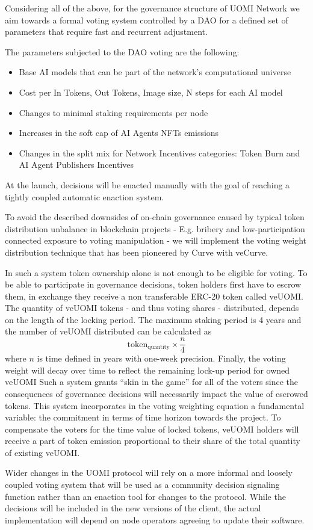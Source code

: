 \documentclass{article}
\begin{document}
Considering all of the above, for the governance structure of UOMI Network we aim towards a formal voting system controlled by a DAO for a defined set of parameters that require fast and recurrent adjustment.

The parameters subjected to the DAO voting are the following:

\begin{itemize}

\item Base AI models that can be part of the network's computational universe
\item Cost per In Tokens, Out Tokens,  Image size, N steps for each AI model
\item Changes to minimal staking requirements per node
\item Increases in the soft cap of AI Agents NFTs emissions
\item Changes in the split mix for Network Incentives categories: Token Burn and AI Agent Publishers Incentives

\end{itemize}

At the launch, decisions will be enacted manually with the goal of reaching a tightly coupled automatic enaction system.

To avoid the described downsides of on-chain governance caused by typical token distribution unbalance in blockchain projects - E.g. bribery and low-participation connected exposure to voting manipulation - we will implement the voting weight distribution technique that has been pioneered by Curve with veCurve. 

In such a system token ownership alone is not enough to be eligible for voting. To be able to participate in governance decisions, token holders first have to escrow them, in exchange they receive a non transferable ERC-20 token called veUOMI. The quantity of veUOMI tokens - and thus voting shares - distributed, depends on the length of the locking period. The maximum staking period is 4 years and the number of veUOMI distributed can be calculated as \[
\text{token}_{\scriptstyle\text{quantity}} \times \frac{n}{4}
\]  where \(n\)  is time defined in years with one-week precision. Finally, the voting weight will decay over time to reflect the remaining lock-up period for owned veUOMI Such a system grants “skin in the game” for all of the voters since the consequences of governance decisions will necessarily impact the value of escrowed tokens. This system incorporates in the voting weighting equation a fundamental variable: the commitment in terms of time horizon towards the project. To compensate the voters for the time value of locked tokens, veUOMI holders will receive a part of token emission proportional to their share of the total quantity of existing veUOMI. 

Wider changes in the UOMI protocol will rely on a more informal and loosely coupled voting system that will be used as a community decision signaling function rather than an enaction tool for changes to the protocol. While the decisions will be included in the new versions of the client, the actual implementation will depend on node operators agreeing to update their software.
\end{document}
